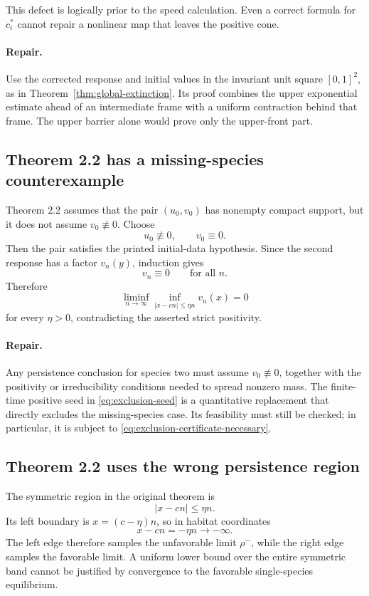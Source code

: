 \documentclass[11pt]{article}
\theoremstyle{definition}
\begin{document}
This defect is logically prior to the speed calculation.  Even a correct
formula for \(c_i^*\) cannot repair a nonlinear map that leaves the positive
cone.

\paragraph{Repair.}
Use the corrected response and initial values in the invariant unit square
\([0,1]^2\), as in Theorem~\ref{thm:global-extinction}.  Its proof combines
the upper exponential estimate ahead of an intermediate frame with a
uniform contraction behind that frame.  The upper barrier alone would prove
only the upper-front part.

\subsection{Theorem 2.2 has a missing-species counterexample}

Theorem 2.2 assumes that the pair \((u_0,v_0)\) has nonempty compact support,
but it does not assume \(v_0\not\equiv0\).  Choose
\[
  u_0\not\equiv0,\qquad v_0\equiv0.
\]
Then the pair satisfies the printed initial-data hypothesis.  Since the
second response has a factor \(v_n(y)\), induction gives
\[
  v_n\equiv0\qquad\text{for all }n.
\]
Therefore
\[
  \liminf_{n\to\infty}
  \inf_{|x-cn|\leq\eta n}v_n(x)=0
\]
for every \(\eta>0\), contradicting the asserted strict positivity.

\paragraph{Repair.}
Any persistence conclusion for species two must assume
\(v_0\not\equiv0\), together with the positivity or irreducibility
conditions needed to spread nonzero mass.  The finite-time positive seed in
\eqref{eq:exclusion-seed} is a quantitative replacement that directly
excludes the missing-species case.  Its feasibility must still be checked;
in particular, it is subject to
\eqref{eq:exclusion-certificate-necessary}.

\subsection{Theorem 2.2 uses the wrong persistence region}

The symmetric region in the original theorem is
\[
  |x-cn|\leq\eta n.
\]
Its left boundary is \(x=(c-\eta)n\), so in habitat coordinates
\[
  x-cn=-\eta n\longrightarrow-\infty.
\]
The left edge therefore samples the unfavorable limit \(\rho^-\), while the
right edge samples the favorable limit.  A uniform lower bound over the
entire symmetric band cannot be justified by convergence to the favorable
single-species equilibrium.
\end{document}
